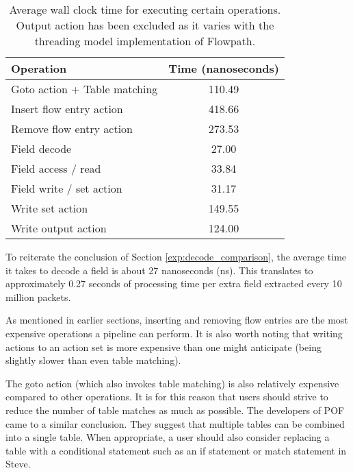 \begin{table}
\caption{Average wall clock time for executing certain operations. Output action has been excluded as it varies with the threading model implementation of Flowpath.}
\begin{center}
\begin{tabularx}{\linewidth}{| X || c | }
\hline
Operation & Time (nanoseconds)  \\
\hline
Goto action + Table matching & 110.49 \\
\hline
Insert flow entry action & 418.66 \\
\hline
Remove flow entry action & 273.53 \\
\hline
Field decode & 27.00 \\
\hline
Field access / read & 33.84 \\
\hline
Field write / set action & 31.17 \\
\hline
Write set action &  149.55 \\
\hline
Write output action & 124.00 \\
\hline
\end{tabularx}
\end{center}
\label{tbl:action_stats}
\end{table}

To reiterate the conclusion of Section \ref{exp:decode_comparison}, the average time it takes to decode a field is about 27 nanoseconds (ns). This translates to approximately 0.27 seconds of processing time per extra field extracted every 10 million packets.

As mentioned in earlier sections, inserting and removing flow entries are the most expensive operations a pipeline can perform. It is also worth noting that writing actions to an action set is more expensive than one might anticipate (being slightly slower than even table matching).

The goto action (which also invokes table matching) is also relatively expensive compared to other operations. It is for this reason that users should strive to reduce the number of table matches as much as possible. The developers of POF \cite{pof_impl} came to a similar conclusion. They suggest that multiple tables can be combined into a single table. When appropriate, a user should also consider replacing a table with a conditional statement such as an if statement or match statement in Steve.